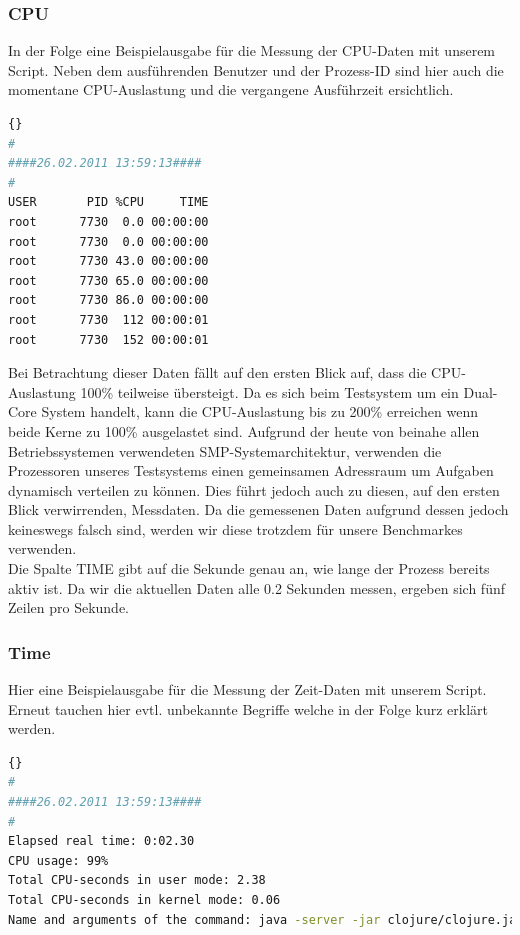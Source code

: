 \documentclass{fancydocument}
\begin{document}
\subsubsection{CPU}
In der Folge eine Beispielausgabe für die  Messung der CPU-Daten mit unserem Script. Neben dem ausführenden Benutzer und der Prozess-ID sind hier auch die momentane CPU-Auslastung und die vergangene Ausführzeit ersichtlich.

\begin{minipage}{\textwidth}
\begin{lstlisting}[language=bash,caption=Speicherdaten]{}
#
####26.02.2011 13:59:13####
#
USER       PID %CPU     TIME
root      7730  0.0 00:00:00
root      7730  0.0 00:00:00
root      7730 43.0 00:00:00
root      7730 65.0 00:00:00
root      7730 86.0 00:00:00
root      7730  112 00:00:01
root      7730  152 00:00:01
\end{lstlisting}
\end{minipage}

Bei Betrachtung dieser Daten fällt auf den ersten Blick auf, dass die CPU-Auslastung 100\% teilweise übersteigt. Da es sich beim Testsystem um ein Dual-Core System handelt, kann die CPU-Auslastung bis zu 200\% erreichen wenn beide Kerne zu 100\% ausgelastet sind. Aufgrund der heute von beinahe allen Betriebssystemen verwendeten SMP-Systemarchitektur, verwenden die Prozessoren unseres Testsystems einen gemeinsamen Adressraum um Aufgaben dynamisch verteilen zu können. Dies führt jedoch auch zu diesen, auf den ersten Blick verwirrenden, Messdaten. Da die gemessenen Daten aufgrund dessen jedoch keineswegs falsch sind, werden wir diese trotzdem für unsere Benchmarkes verwenden.
\\
Die Spalte TIME gibt auf die Sekunde genau an, wie lange der Prozess bereits aktiv ist. Da wir die aktuellen Daten alle 0.2 Sekunden messen, ergeben sich fünf Zeilen pro Sekunde.

\subsubsection{Time}

Hier eine Beispielausgabe für die Messung der Zeit-Daten mit unserem Script. Erneut tauchen hier evtl. unbekannte Begriffe welche in der Folge kurz erklärt werden.

\begin{minipage}{\textwidth}
\begin{lstlisting}[language=bash,caption=Speicherdaten]{}
#
####26.02.2011 13:59:13####
#
Elapsed real time: 0:02.30
CPU usage: 99%
Total CPU-seconds in user mode: 2.38
Total CPU-seconds in kernel mode: 0.06
Name and arguments of the command: java -server -jar clojure/clojure.jar
\end{lstlisting}
\end{minipage}
\end{document}
